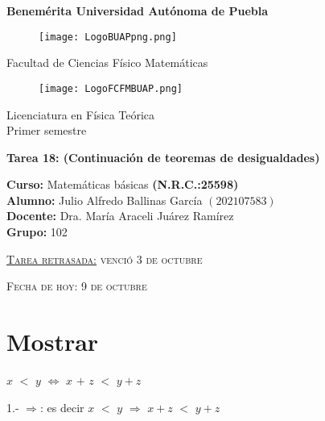 \documentclass[12pt]{article}
\begin{document}
\pagestyle{empty} 
\setlength{\parindent}{0pt}
\sffamily
\begin{center} \LARGE{\bf Benemérita Universidad Autónoma de Puebla} \\[0.5cm]
\begin{figure}[htb] \centering \texttt{[image: LogoBUAPpng.png]} \end{figure}
\LARGE{Facultad de Ciencias Físico Matemáticas}\\[0.5cm]
\begin{figure}[htb] \centering \texttt{[image: LogoFCFMBUAP.png]} \end{figure} 
\Large{Licenciatura en Física Teórica}\\[0.5cm]
\large{Primer semestre} \end{center}
\begin{center} { \Large \bfseries{Tarea 18}: (Continuación de teoremas de desigualdades)} \\ \end{center}
\large{\bf Curso:} Matemáticas básicas \textbf{(N.R.C.:25598)}\\
\large{\bf Alumno:} Julio Alfredo Ballinas García $\left(202107583\right)$ \\
\large{\bf Docente:} Dra. María Araceli Juárez Ramírez\\
\large{\bf Grupo:} 102\\ \begin{center} 
\vfill
\textsc{\underline{Tarea retrasada:} venció 3 de octubre} \end{center}
\begin{center}
\textsc{Fecha de hoy: 9 de octubre}
\end{center}
\newpage

\section{Mostrar {} {}} \vspace{.5cm}

{\LARGE{{} \hspace{.1cm} $x$ $<$ $y$ $\Longleftrightarrow$ $x$ $+$ $z$ $<$ $y+z$}} \vspace{.5cm}


{\textcolor{onyx}{1.-}} {} {\textcolor{pakistangreen}{{\Large{$\Longrightarrow$}}}}: es decir {\Large{$x$ $<$ $y$ $\Longrightarrow$ $x+z$ $<$ $y+z$}} \vspace{0.5cm}
\end{document}
